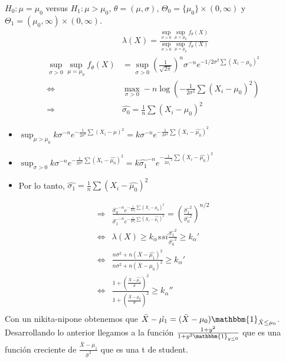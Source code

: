 \documentclass[10pt]{article}
\theoremstyle{plain}
\theoremstyle{definition}
\begin{document}
$H_{0}:\mu=\mu_{0}$ versus $H_{1}: \mu > \mu_{0}$, $\theta = (\mu,\sigma)$, $\Theta_{0}=\{\mu_{0}\}\times (0,\infty)$ y $\Theta_{1}=(\mu_{0},\infty)\times (0,\infty)$.
\begin{align*}
&\lambda(X) = \frac{\sup_{\sigma>0}\sup_{\mu>\mu_{0}}f_{\theta}(X)}{\sup_{\sigma>0}\sup_{\mu=\mu_{0}}f_{\theta}(X)}\\
\sup_{\sigma>0}\sup_{\mu=\mu_{0}}f_{\theta}(X) &= \sup_{\sigma>0} \left(\frac{1}{\sqrt{2\pi}}\right)^n\sigma^{-n}e^{-1/2\sigma^2\sum (X_{i}-\mu_{0})^2}\\
\Leftrightarrow &\max_{\sigma>0} -n\log \left(-\frac{1}{2\sigma^2}\sum (X_{i}-\mu_{0})^2\right)\\
\Rightarrow & \hat{\sigma_{0}} = \frac{1}{n} \sum (X_{i}-\mu_{0})^2
\end{align*}
\begin{itemize}
\item $\sup_{\mu>\mu_{0}}k\sigma^{-n}e^{-\frac{1}{2\sigma^2}\sum (X_{i}- \mu)^2} = k \sigma^{-n}e^{-\frac{1}{2\sigma^2}\sum (X_{i}-\hat{\mu_{0}})^2}$
\item $\sup_{\sigma>0}k\sigma^{-n}e^{-\frac{1}{2\sigma^2}\sum (X_{i}- \hat{\mu_{0}})^2} = k \hat{\sigma_{1}}^{-n}e^{-\frac{1}{2\hat{\sigma_{1}}^2}\sum (X_{i}-\hat{\mu_{0}})^2}$
\item Por lo tanto, $\hat{\sigma_{1}} = \frac{1}{n}\sum (X_{i}-\hat{\mu_{0}})^2$
\end{itemize}
\begin{align*}
\Rightarrow & \frac{\hat{\sigma_{0}}^{-n}e^{-\frac{1}{2\hat{\sigma_{0}}}\sum (X_{i}-\mu_{0})^2}}{\hat{\sigma_{1}}^{-n}e^{-\frac{1}{2\hat{\sigma_{1}}}\sum (X_{i}-\hat{\mu_{1}})^2}} = \left(\frac{\hat{\sigma_{1}}^2}{\hat{\sigma_{0}}^2}\right)^{n/2}\\
\Leftrightarrow & \lambda(X) \ge k_{\alpha} ssi \frac{\hat{\sigma_{1}}^2}{\hat{\sigma_{0}}^2} \ge k_{\alpha}'\\
\Leftrightarrow &\frac{n\sigma^2 + n(\bar{X}-\hat{\mu_{1}})^2}{n\sigma^2+n(\bar{X}-\mu_{0})^2}\ge k_{\alpha}'\\
\Leftrightarrow &\frac{1 + \left(\frac{\bar{X}-\hat{\mu_{1}}}{\hat{\sigma}}\right)^2}{1 + \left(\frac{\bar{X}-\mu_{0}}{\hat{\sigma}}\right)^2}\ge k_{\alpha}''\\
\end{align*}
Con un nikita-nipone obtenemos que $\bar{X}-\hat{\mu_{1}} = (\bar{X}-\mu_{0})\mathbbm{1}_{\bar{X}\le \mu_{0}}$. Desarrollando lo anterior llegamos a la función $\frac{1+y^2}{1+y^2\mathbbm{1}_{y\le0}}$ que es una función creciente de $\frac{\bar{X}-\mu_{1}}{\hat{\sigma}^2}$ que es una t de student.
\end{document}
